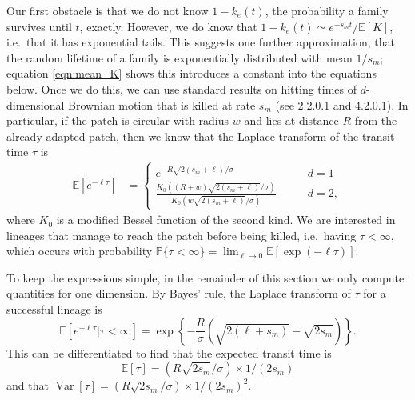 \documentclass{article}
\newcommand{\linelabel}[1]{}
\newcommand{\citet}[1]{\cite{#1}}
\DeclareMathOperator{\var}{Var}
\renewcommand{\P}{\mathbb{P}}
\newcommand{\E}{\mathbb{E}}
\newcommand{\plr}[1]{{\it\color{blue}(#1)}}
\begin{document}
Our first obstacle is that we do not know $1-k_e(t)$, 
the probability a family survives until $t$, exactly.
However, we do know that $1-k_e(t) \simeq e^{-s_m t} / \E[K]$,
i.e.\ that it has exponential tails.
This suggests one further approximation, 
that the random lifetime of a family is exponentially distributed with mean $1/s_m$;
equation \eqref{eqn:mean_K} shows this introduces a constant into the equations below. \linelabel{rr:EK}
Once we do this, 
we can use standard results on hitting times of $d$-dimensional Brownian motion
that is killed at rate $s_m$ (see \citet{borodin2002handbook} 2.2.0.1 and 4.2.0.1).
In particular, if the patch is circular with radius $w$ and lies at distance
$R$ from the already adapted patch, then 
we know that the Laplace transform of the transit time $\tau$ is
\begin{align}
  \E[e^{-\ell \tau}] &=
    \begin{cases}
      e^{- R \sqrt{2(s_m+\ell)}/\sigma} \qquad & d=1 \\
      \frac{ K_0( (R+w)\sqrt{2(s_m+\ell)}/\sigma) }{ K_0( w\sqrt{2(s_m+\ell)}/\sigma) } \qquad & d=2  ,
    \end{cases} \label{eqn:borodinresult}
\end{align}
where $K_0$ is a modified Bessel function of the second kind.
We are interested in lineages that manage to reach the patch before being killed,
i.e.\ having $\tau < \infty$,
which occurs with probability
$\P\{\tau < \infty\} = \lim_{\ell \to 0} \E \left[\exp(-\ell \tau) \right]$. 

To keep the expressions simple, in the remainder of this section we only compute quantities for one dimension.
By Bayes' rule, the Laplace transform of $\tau$ for a successful lineage is
\begin{equation} \label{eqn:haplen_cdf}
\E[e^{-\ell \tau}|\tau<\infty]  = \exp\left\{{-\frac{R}{\sigma}\left(\sqrt{2(\ell+s_m)} - \sqrt{2s_m}\right)}\right\} .
\end{equation}
This can be differentiated to find that the expected transit time is
\begin{equation} 
  \E[\tau] = (R\sqrt{2s_m}/\sigma)\times 1/(2s_m) \label{eqn:mean_tau}
\end{equation}
and that $\var[\tau] = (R\sqrt{2s_m}/\sigma) \times 1/(2s_m)^2$.


\end{document}
